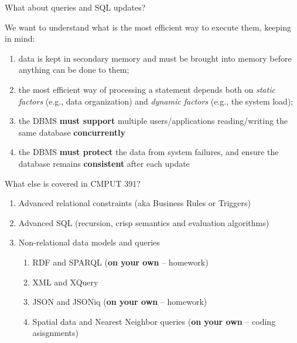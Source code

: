 \documentclass[xcolor={usenames,dvipsnames}]{beamer}
\begin{document}


\begin{frame}{What about queries and SQL updates?}

We want to understand what is the \alert{most efficient} way to execute them, keeping in mind:

\begin{enumerate}[label=(\alph*)]
\item data is kept in secondary memory and must be brought into memory before anything can be done to them;

\item the most efficient way of processing a statement depends both on \emph{static factors} (e.g., data organization) and \emph{dynamic factors} (e.g., the system load);

\item the DBMS \textbf{must support} multiple users/applications reading/writing the same database \textbf{concurrently}

\item the DBMS \textbf{must protect} the data from system failures, and \alert{ensure the database remains \textbf{consistent}} after each update
\end{enumerate}
\end{frame}

\begin{frame}{What \alert{else} is covered in CMPUT 391?}

\begin{enumerate}[label=\arabic* - ]
	\item Advanced relational constraints (aka Business Rules or Triggers)
	\item Advanced SQL (recursion, crisp semantics and evaluation algorithms)
	\item Non-relational data models and queries
		\begin{enumerate}[label=\roman* - ]
		\item RDF and SPARQL (\textbf{on your own} -- homework)
		\item XML and XQuery
		\item JSON and JSONiq (\textbf{on your own} -- homework)
		\item Spatial data and Nearest Neighbor queries (\textbf{on your own} -- coding asisgnments)
	\end{enumerate}
\end{enumerate}


\end{frame}
\end{document}
